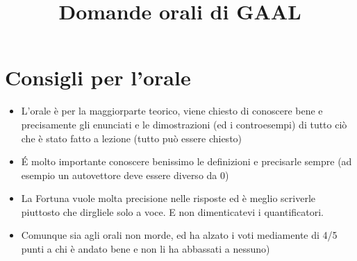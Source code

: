 \documentclass[a4paper,NoNotes,GeneralMath]{stdmdoc}
\begin{document}
	\title {Domande orali di GAAL}
	\autodate

	\section*{Consigli per l'orale}
	\begin{itemize}
		\item L'orale è per la maggiorparte teorico, viene chiesto di conoscere bene e precisamente gli enunciati e le dimostrazioni (ed i controesempi) di tutto ciò che è stato fatto a lezione (tutto può essere chiesto)
		\item \'E molto importante conoscere benissimo le definizioni e precisarle sempre (ad esempio un autovettore deve essere diverso da $0$)
		\item La Fortuna vuole molta precisione nelle risposte ed è meglio scriverle piuttosto che dirgliele solo a voce. E non dimenticatevi i quantificatori.
		\item Comunque sia agli orali non morde, ed ha alzato i voti mediamente di 4/5 punti a chi è andato bene e non li ha abbassati a nessuno)
	\end{itemize}
\end{document}

